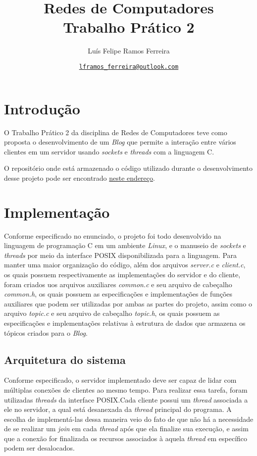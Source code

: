 \documentclass{article}
\title{Redes de Computadores \\ \large Trabalho Prático 2}
\author{Luís Felipe Ramos Ferreira}
\date{\href{mailto:lframos\_ferreira@outlook.com}{\texttt{lframos\_ferreira@outlook.com}}
}
\begin{document}
\maketitle

\section{Introdução}

O Trabalho Prático 2 da disciplina de Redes de Computadores teve como proposta
o desenvolvimento de um \textit{Blog} que permite a interação entre vários
clientes em um servidor usando \textit{sockets} e \textit{threads} com a
linguagem C.

O repositório onde está armazenado o código utilizado durante o desenvolvimento
desse projeto
pode ser encontrado \href{https://github.com/lframosferreira/tp2-redes}{neste
      endereço}.

\section{Implementação}

Conforme especificado no enunciado, o projeto foi todo desenvolvido na
linguagem de programação C em um ambiente \textit{Linux}, e o manuseio de
\textit{sockets} e \textit{threads} por
meio da interface POSIX
disponibilizada para a linguagem. Para manter uma maior organização do código,
além dos arquivos \textit{server.c} e \textit{client.c}, os quais possuem
respectivamente as implementações do servidor e do cliente,
foram criados uos arquivos auxiliares \textit{common.c} e seu arquivo de
cabeçalho
\textit{common.h}, os quais possuem as especificações e implementações de
funções auxiliares que podem ser utilizadas por ambas as partes do projeto,
assim como o arquivo \textit{topic.c} e seu arquivo de cabeçalho
\textit{topic.h},
os quais possuem as especificações e implementações relativas à estrutura de
dados que armazena os tópicos criados para o \textit{Blog}.

\subsection{Arquitetura do sistema}

Conforme especificado, o servidor implementado deve ser capaz de lidar com
múltiplas conexões de clientes ao mesmo tempo. Para realizar essa tarefa,
foram utilizadas \textit{threads} da interface POSIX.\@ Cada cliente possui um
\textit{thread} associada a ele no servidor, a qual está desanexada da
\textit{thread}
principal do programa. A escolha de implementá-las dessa maneira veio do fato
de que não há a necessidade de se realizar um \textit{join} em cada
\textit{thread} após que ela finalize sua execução, e assim
que a conexão for finalizada os recursos associados à aquela \textit{thread} em
específico podem ser desalocados.
\end{document}
